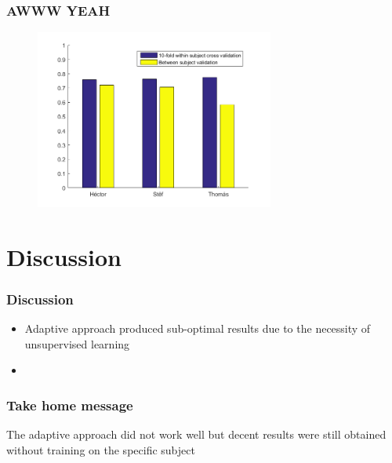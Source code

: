 \documentclass{beamer}
\begin{document}
\begin{frame}
  \frametitle{AWWW YEAH}

 \begin{figure}
  \centering
     \includegraphics[width=0.7\textwidth]{bars.png}
 \end{figure}

\end{frame}

\section{Discussion}
\begin{frame}

\frametitle{Discussion}
  \begin{itemize}
   \item Adaptive approach produced sub-optimal results due to the necessity of unsupervised learning
   \item 
  \end{itemize}
\end{frame}



\begin{frame}

\frametitle{Take home message}
The adaptive approach did not work well but decent results were still obtained without training on the specific subject
\end{frame}
\end{document}
